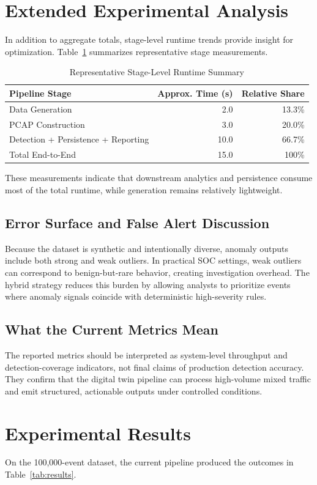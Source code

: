 \documentclass[conference]{IEEEtran}
\begin{document}
\section{Extended Experimental Analysis}
In addition to aggregate totals, stage-level runtime trends provide insight for optimization. Table~\ref{tab:stageperf} summarizes representative stage measurements.

\begin{table}[h]
\centering
\caption{Representative Stage-Level Runtime Summary}
\label{tab:stageperf}
\begin{tabular}{lrr}
\toprule
Pipeline Stage & Approx. Time (s) & Relative Share \\
\midrule
Data Generation & 2.0 & 13.3\% \\
PCAP Construction & 3.0 & 20.0\% \\
Detection + Persistence + Reporting & 10.0 & 66.7\% \\
\midrule
Total End-to-End & 15.0 & 100\% \\
\bottomrule
\end{tabular}
\end{table}

These measurements indicate that downstream analytics and persistence consume most of the total runtime, while generation remains relatively lightweight.

\subsection{Error Surface and False Alert Discussion}
Because the dataset is synthetic and intentionally diverse, anomaly outputs include both strong and weak outliers. In practical SOC settings, weak outliers can correspond to benign-but-rare behavior, creating investigation overhead. The hybrid strategy reduces this burden by allowing analysts to prioritize events where anomaly signals coincide with deterministic high-severity rules.

\subsection{What the Current Metrics Mean}
The reported metrics should be interpreted as system-level throughput and detection-coverage indicators, not final claims of production detection accuracy. They confirm that the digital twin pipeline can process high-volume mixed traffic and emit structured, actionable outputs under controlled conditions.

\section{Experimental Results}
On the 100,000-event dataset, the current pipeline produced the outcomes in Table~\ref{tab:results}.
\end{document}
